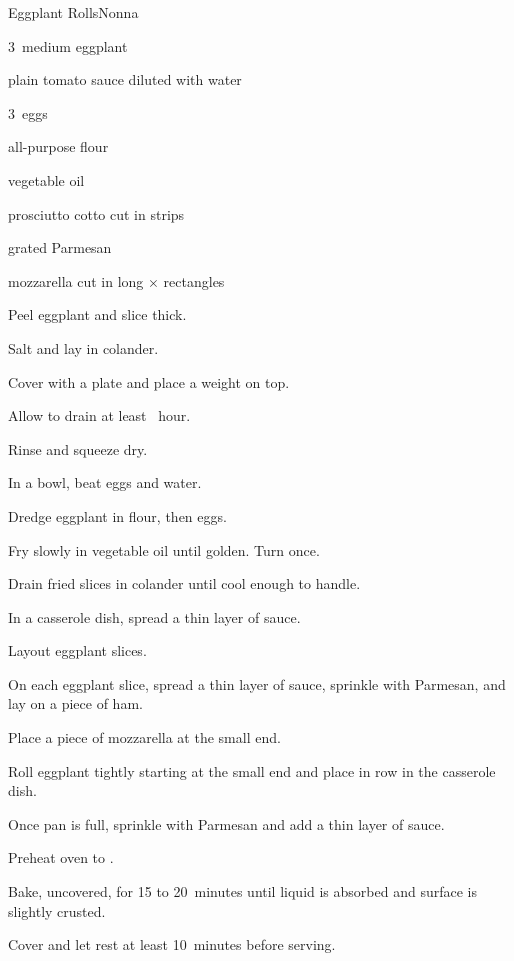\begin{recipe}{Eggplant Rolls}{Nonna}{}

\begin{ingredients}
\item 3~medium eggplant
\item plain tomato sauce diluted with water
\item 3~eggs
\item all-purpose flour
\item vegetable oil
\item prosciutto cotto cut in  strips
\item grated Parmesan
\item mozzarella cut in long \inch{\quarter}$\times$\inch{\quarter} rectangles
\end{ingredients}

\begin{directions}
\item Peel eggplant and slice \inch{\quarter} thick.
\item Salt and lay in colander.
\item Cover with a plate and place a weight on top.
\item Allow to drain at least \half{}~hour.
\item Rinse and squeeze dry.
\item In a bowl, beat eggs and \C{\half} water.
\item Dredge eggplant in flour, then eggs.
\item Fry slowly in  vegetable oil until golden. Turn once.
\item Drain fried slices in colander until cool enough to handle.
\item In a casserole dish, spread a thin layer of sauce.
\item Layout eggplant slices.
\item On each eggplant slice, spread a thin layer of sauce, sprinkle with Parmesan, and lay on a piece of ham.
\item Place a piece of mozzarella at the small end.
\item Roll eggplant tightly starting at the small end and place in row in the casserole dish.
\item Once pan is full, sprinkle with Parmesan and add a thin layer of sauce.
\item Preheat oven to .
\item Bake, uncovered, for 15 to 20~minutes until liquid is absorbed and surface is slightly crusted.
\item Cover and let rest at least 10~minutes before serving.
\end{directions}

\end{recipe}
